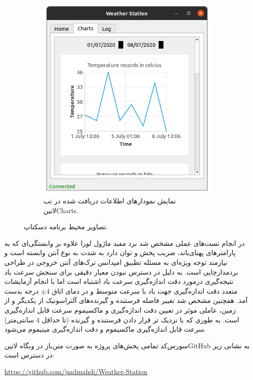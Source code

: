 \begin{figure}[!h]
\begin{subfigure}[b]{0.5\textwidth}
		\includegraphics[width=\linewidth]{Assets/desktopAppCharts.png}
		\caption{نمایش نمودار‌های اطلاعات دریافت شده در تب ‌لاتین{Charts}.}
		\label{fig:desktopAppCharts}
	\end{subfigure}
	\caption{تصاویر محیط برنامه دسکتاپ.}
	\label{fig:desktopApp}
\end{figure}

در انجام تست‌های عملی مشخص شد برد مفید ماژول لورا علاوه بر وابستگی‌ای که به پارامتر‌های پهنای‌باند، ضریب پخش و توان دارد به شدت به نوع آنتن وابسته است و نیازمند توجه ویژه‌ای به مسئله تطبیق امپدانس ترک‌های آنتن خروجی در طراحی برد‌مدار‌چاپی است. به دلیل در دسترس نبودن معیار دقیقی برای سنجش سرعت باد نتیجه‌گیری درمورد دقت اندازه‌گیری سرعت باد اشتباه است اما با انجام آزمایشات متعدد دقت اندازه‌گیری جهت باد با سرعت متوسط و در دمای اتاق 4$\pm$ درجه بدست آمد. همچنین مشخص شد تغییر فاصله فرستنده و گیرنده‌های آلتراسونیک از یکدیگر و از زمین، عاملی موثر در تعیین دقت اندازه‌گیری و ماکسیموم سرعت قابل اندازه‌گیری است. به طوری که با نزدیک تر قرار دادن فرستنده و گیرنده (تا حداقل 4 سانتی‌متر) سرعت قابل اندازه‌گیری ماکسیموم و دقت اندازه‌گیری مینیموم می‌شود. 

\vspace{1cm}
\noindent
سورس‌کد تمامی پخش‌های پروژه به صورت متن‌باز در وبگاه ‌لاتین{GitHub} به نشانی زیر در دسترس است:

\begin{latin}\noindent
	\href{https://github.com/jmdmahdi/Weather-Station}{https://github.com/jmdmahdi/Weather-Station}
\end{latin}

